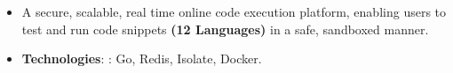 \begin{itemize}
\normalsize

\item A secure, scalable, real time online code execution platform, enabling users to test and run code snippets \textbf{(12 Languages)} in a safe, sandboxed manner.
\item \textbf{Technologies}: : Go, Redis, Isolate, Docker.\\


\end{itemize}
\smallskip
